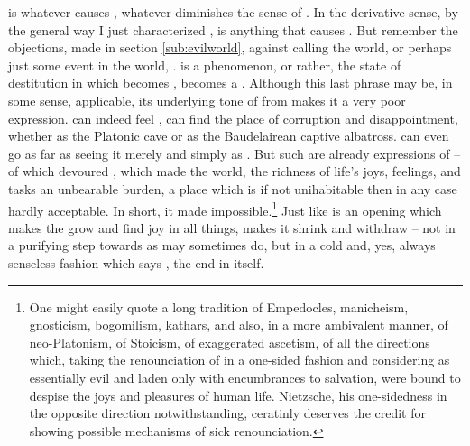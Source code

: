 {\pa {} is whatever causes , whatever diminishes
the sense of .  In the derivative sense, by the
general way I just characterized ,  is anything that
causes .  But remember the objections, made in section
\ref{sub:evilworld}, against calling the world, or perhaps just some
event in the world, .   is a 
phenomenon, or rather, the state of  destitution in
which  becomes , becomes a .  Although this last phrase may be, in some sense, applicable,
its underlying tone of  from  makes it a
very poor expression.   can indeed feel , 
can find  the place of corruption and disappointment, 
whether as the Platonic cave or as the Baudelairean captive albatross.
 can even go as far as seeing it merely and simply as . 
But such  are already expressions of  -- of
 which devoured , which made the world, the
richness of life's joys, feelings, and tasks an unbearable burden, a
place which is if not unihabitable then in any case hardly acceptable. 
In short, it made  impossible.\footnote{One might
easily quote a long tradition of Empedocles, manicheism, gnosticism,
bogomilism, kathars, and also, in a more ambivalent manner, of
neo-Platonism, of Stoicism, of exaggerated ascetism, of all the
directions which, taking the  renounciation of  in a one-sided fashion and considering  as
essentially evil and laden only with encumbrances to salvation, were bound
to despise the joys and pleasures of human life.  Nietzsche, his
one-sidedness in the opposite direction notwithstanding, ceratinly
deserves the credit for showing possible mechanisms of sick
renounciation.
} 
Just like  is an opening which makes the  grow 
and find joy in all things,  makes it shrink and withdraw -- 
not in a purifying step towards  as  may 
sometimes do, but in a cold and, yes, always senseless fashion which 
says , the end in itself.



}
